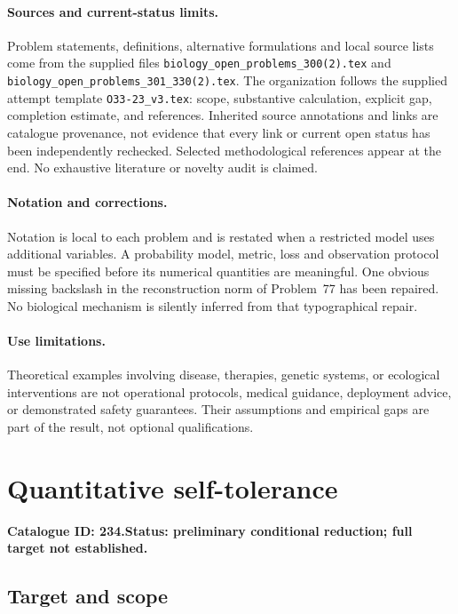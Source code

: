 \documentclass[11pt]{article}
\begin{document}
\paragraph{Sources and current-status limits.}
Problem statements, definitions, alternative formulations and local source lists
come from the supplied files
\texttt{biology\_open\_problems\_300(2).tex} and
\texttt{biology\_open\_problems\_301\_330(2).tex}.
The organization follows the supplied attempt template
\texttt{O33-23\_v3.tex}: scope, substantive calculation, explicit gap,
completion estimate, and references. Inherited source annotations and links are
catalogue provenance, not evidence that every link or current open status has
been independently rechecked. Selected methodological references appear at the
end. No exhaustive literature or novelty audit is claimed.

\paragraph{Notation and corrections.}
Notation is local to each problem and is restated when a restricted model uses
additional variables. A probability model, metric, loss and observation protocol
must be specified before its numerical quantities are meaningful. One obvious
missing backslash in the reconstruction norm of Problem~77 has been repaired.
No biological mechanism is silently inferred from that typographical repair.

\paragraph{Use limitations.}
Theoretical examples involving disease, therapies, genetic systems, or ecological
interventions are not operational protocols, medical guidance, deployment advice,
or demonstrated safety guarantees. Their assumptions and empirical gaps are part
of the result, not optional qualifications.

\setcounter{section}{233}
\section{Quantitative self-tolerance}
\label{prob:234}
\noindent\textbf{Catalogue ID: 234.}\quad \textbf{Status: preliminary conditional reduction; full target not established.}
\subsection{Target and scope}
\end{document}

